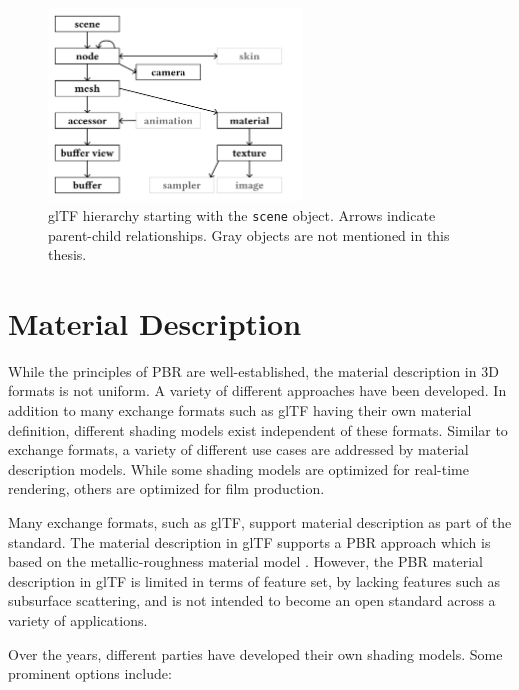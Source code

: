 \begin{figure}[H]
  \centering
  \includegraphics[width=0.6\textwidth]{resources/gltf-hierarchy.png}
  \caption{glTF hierarchy starting with the \texttt{scene} object. Arrows indicate parent-child relationships. Gray objects are not mentioned in this thesis.}
  \label{fig:gltf-hierarchy}
\end{figure}

\section{Material Description}

While the principles of \gls{PBR} are well-established, the material description in 3D formats is not uniform. A variety of different approaches have been developed. In addition to many exchange formats such as \gls{glTF} having their own material definition, different shading models exist independent of these formats. Similar to exchange formats, a variety of different use cases are addressed by material description models. While some shading models are optimized for real-time rendering, others are optimized for film production.

Many exchange formats, such as \gls{glTF}, support material description as part of the standard. The material description in \gls{glTF} supports a \gls{PBR} approach which is based on the metallic-roughness material model . However, the \gls{PBR} material description in \gls{glTF} is limited in terms of feature set, by lacking features such as subsurface scattering, and is not intended to become an open standard across a variety of applications.

Over the years, different parties have developed their own shading models. Some prominent options include:

